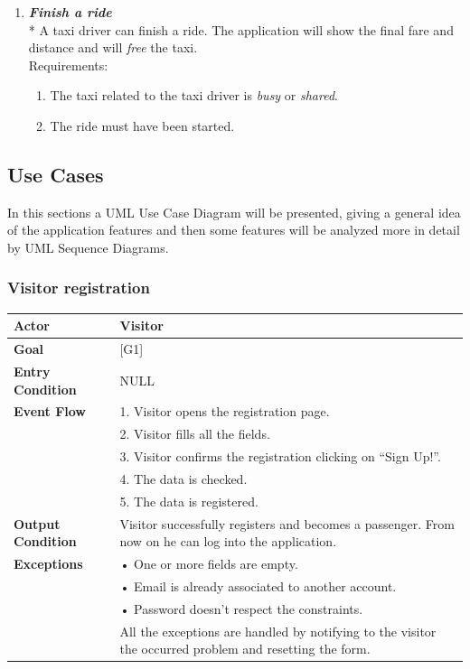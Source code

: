 \documentclass{article}
\begin{document}
\begin{enumerate}
\item \textit{\textbf{Finish a ride}}\\*
A taxi driver can finish a ride. The application will show the final fare and distance and will \textit{free} the taxi.\\
Requirements:
\begin{enumerate}
\item The taxi related to the taxi driver is \textit{busy} or \textit{shared}.
\item The ride must have been started.
\end{enumerate}

\end{enumerate}



\subsection{Use Cases}
In this sections a UML Use Case Diagram will be presented, giving a general idea of the application features and then some features will be analyzed more in detail by UML Sequence Diagrams.  

\subsubsection{Visitor registration}
\begin{tabular}{| l | p{8cm} |}
\hline
\textbf{Actor}      &       Visitor \\
\hline
\textbf{Goal}       &       [G1]\\
\hline
\textbf{Entry Condition} &  NULL\\
\hline
\textbf{Event Flow}     &   1.	Visitor opens the registration page.\\&
                                            2.	Visitor fills all the fields.\\&
                                            3.	Visitor confirms the registration clicking on “Sign Up!”.\\&
                                            4.  The data is checked.\\&
                                            5.	The data is registered.\\
\hline
\textbf{Output Condition} & Visitor successfully registers and becomes a passenger. From now on he can log into the application.\\
\hline
\textbf{Exceptions} &       •   One or more fields are empty.\\& 
                            •	Email is already associated to another account.\\&
                            •	Password doesn't respect the constraints.\\& 
                            All the exceptions are handled by notifying to the visitor the occurred problem and resetting the form.\\
\hline
\end{tabular} 
\end{document}

